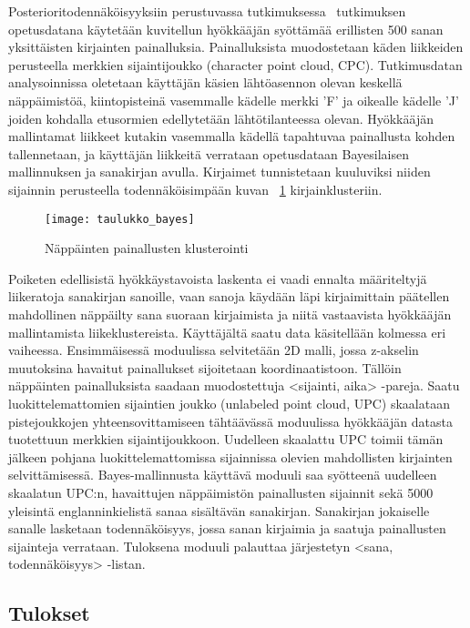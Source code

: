 \documentclass[finnish]{tktltiki2}
\theoremstyle{definition}
\theoremstyle{remark}
\begin{document}
Posterioritodennäköisyyksiin perustuvassa tutkimuksessa~\cite{mole} tutkimuksen opetusdatana käytetään kuvitellun hyökkääjän syöttämää erillisten 500 sanan yksittäisten kirjainten painalluksia. Painalluksista muodostetaan käden liikkeiden perusteella merkkien sijaintijoukko (character point cloud, CPC). Tutkimusdatan analysoinnissa oletetaan käyttäjän käsien lähtöasennon olevan keskellä näppäimistöä, kiintopisteinä vasemmalle kädelle merkki 'F' ja oikealle kädelle 'J' joiden kohdalla etusormien edellytetään lähtötilanteessa olevan. Hyökkääjän mallintamat liikkeet kutakin vasemmalla kädellä tapahtuvaa painallusta kohden tallennetaan, ja käyttäjän liikkeitä verrataan opetusdataan Bayesilaisen mallinnuksen ja sanakirjan avulla. Kirjaimet tunnistetaan kuuluviksi niiden sijainnin perusteella todennäköisimpään kuvan ~\ref{fig:bayes} kirjainklusteriin.

\begin{figure}[!h]
\centering
\texttt{[image: taulukko\_bayes]}
\caption{Näppäinten painallusten klusterointi}
\label{fig:bayes}
\end{figure}

Poiketen edellisistä hyökkäystavoista laskenta ei vaadi ennalta määriteltyjä liikeratoja sanakirjan sanoille, vaan sanoja käydään läpi kirjaimittain päätellen mahdollinen näppäilty sana suoraan kirjaimista ja niitä vastaavista hyökkääjän mallintamista liikeklustereista. 
Käyttäjältä saatu data käsitellään kolmessa eri vaiheessa. Ensimmäisessä moduulissa selvitetään 2D malli, jossa z-akselin muutoksina havaitut painallukset sijoitetaan koordinaatistoon. Tällöin näppäinten painalluksista saadaan muodostettuja <sijainti, aika> -pareja. Saatu luokittelemattomien sijaintien joukko (unlabeled point cloud, UPC) skaalataan pistejoukkojen yhteensovittamiseen tähtäävässä moduulissa hyökkääjän datasta tuotettuun merkkien sijaintijoukkoon. Uudelleen skaalattu UPC toimii tämän jälkeen pohjana luokittelemattomissa sijainnissa olevien mahdollisten kirjainten selvittämisessä. 
Bayes-mallinnusta käyttävä moduuli saa syötteenä uudelleen skaalatun UPC:n, havaittujen näppäimistön painallusten sijainnit sekä 5000 yleisintä englanninkielistä sanaa sisältävän sanakirjan. Sanakirjan jokaiselle sanalle lasketaan todennäköisyys, jossa sanan kirjaimia ja saatuja painallusten sijainteja verrataan. Tuloksena moduuli palauttaa järjestetyn <sana, todennäköisyys> -listan.

\subsection{Tulokset}
\end{document}

